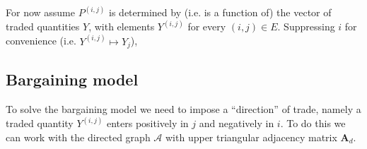 \documentclass[american]{scrartcl}
\newcommand{\E}{\mathbb{E}}
\renewcommand{\L}{\mathcal{L}}
\newcommand{\matr}[1]{\bm{#1}}
\begin{document}
For now assume $P^{(i, j)}$ is determined by (i.e. is a function of) the vector of traded quantities $Y$, with elements $Y^{(i, j)}$ for every $(i, j) \in E$. Suppressing $i$ for convenience (i.e. $Y^{(i, j)} \mapsto Y_j$),

\subsection{Bargaining model}

To solve the bargaining model we need to impose a ``direction'' of trade, namely a traded quantity $Y^{(i, j)}$ enters positively in $j$ and negatively in $i$. To do this we can work with the directed graph $\mathcal{A}$ with upper triangular adjacency matrix $\matr{A}_{d}$.
\end{document}
